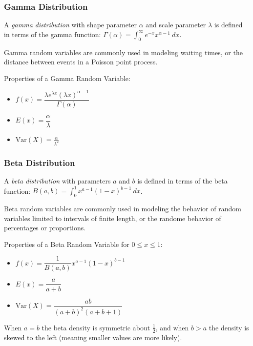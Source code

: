 \documentclass[10pt]{article}
\theoremstyle{definition}
\theoremstyle{theorem}
\begin{document}
		\subsubsection*{Gamma Distribution}
		A \emph{gamma distribution} with shape parameter \(\alpha\) and scale parameter \(\lambda\) is defined in terms of the gamma function: \(\Gamma(\alpha)=\displaystyle\int_{0}^{\infty}e^{-x}x^{\alpha-1}\: dx\). 
		
		Gamma random variables are commonly used in modeling waiting times, or the distance between events in a Poisson point process.
		
		Properties of a Gamma Random Variable:
		\begin{multicols}{3}
			\begin{itemize}
				\item $f(x) = \dfrac{\lambda e^{\lambda x}(\lambda x)^{\alpha - 1}}{\Gamma(\alpha)}$
				\item $E(x) = \dfrac{\alpha}{\lambda}$
				\item $\text{Var}(X) = \frac{\alpha}{\lambda^2}$
			\end{itemize}
		\end{multicols}
		
		\subsubsection*{Beta Distribution}
		A \emph{beta distribution} with parameters \(a\) and \(b\) is defined in terms of the beta function: \(B(a,b)=\displaystyle\int_{0}^{1}x^{a-1}(1-x)^{b-1}\: dx\). 
		
		Beta random variables are commonly used in modeling the behavior of random variables limited to intervals of finite length, or the randome behavior of percentages or proportions.
		
		Properties of a Beta Random Variable for \(0 \leq x \leq 1\):
		\begin{multicols}{3}
			\begin{itemize}
				\item $f(x) = \dfrac{1}{B(a,b)}x^{a-1}(1-x)^{b-1}$
				\item $E(x) = \dfrac{a}{a+b}$
				\item $\text{Var}(X) = \dfrac{ab}{(a+b)^2(a+b+1)}$
			\end{itemize}
		\end{multicols}
		When \(a=b\) the beta density is symmetric about \(\frac{1}{2}\), and when \(b>a\) the density is skewed to the left (meaning smaller values are more likely).
		
\end{document}
